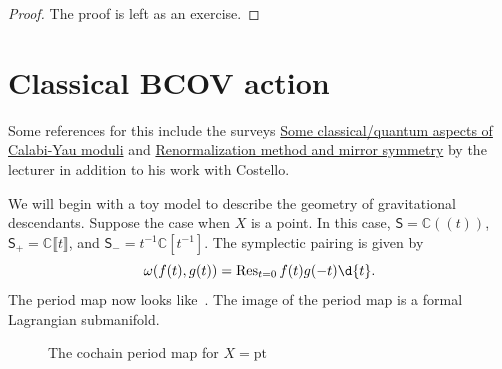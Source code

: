 \documentclass[article,10pt,oneside,oldfontcommands]{memoir}
\theoremstyle{definition}
\theoremstyle{remark}
\theoremstyle{plain}
\theoremstyle{definition}
\theoremstyle{remark}
\newcommand{\C}{\mathbb{C}}
\newcommand{\mc}[1]{\mathcal{#1}}
\newcommand{\mr}[1]{\mathrm{#1}}
\newcommand{\on}[1]{\operatorname{#1}}
\newcommand{\ms}[1]{\mathsf{#1}}
\newcommand{\1}{\mathbf{1}}
\newcommand{\2}{\mathbf{2}}
\newcommand{\3}{\mathbf{3}}
\newcommand{\ps}[1]{\lBrack #1 \rBrack}
\newcommand{\ls}[1]{(\!( #1 )\!)}
\begin{document}
\begin{proof}
    The proof is left as an exercise.
\end{proof}

\chapter{Classical BCOV action}%
\label{cha:Classical BCOV action}

Some references for this include the surveys \href{https://link.springer.com/content/pdf/10.1007/978-3-319-94220-9_4.pdf}{Some classical/quantum aspects of Calabi-Yau moduli} and \href{https://sigma-journal.com/2012/101/sigma12-101.pdf}{Renormalization method and mirror symmetry} by the lecturer in addition to his work with Costello.

We will begin with a toy model to describe the geometry of gravitational descendants. Suppose the case when \(X\) is a point. In this case, \(\ms{S} = \C \ls{t}\), \(\ms{S}_+ = \C \ps{t}\), and \(\ms{S}_- = t^{-1} \C[t^{-1}]\). The symplectic pairing is given by
\[ \omega(f(t), g(t)) = \on{Res}_{t = 0} f(t) g(-t) \d{t}. \]
The period map now looks like~. The image of the period map is a formal Lagrangian submanifold.

\begin{figure}[htpb]
\begin{center}
\end{center}
\caption{The cochain period map for \(X = \mr{pt}\)}%
\label{fig:cochain-period-map-point}
\end{figure}
\end{document}
